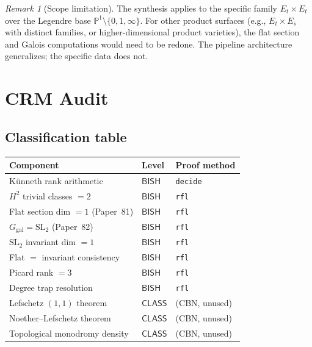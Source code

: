 \documentclass[11pt]{article}
\theoremstyle{plain}
\theoremstyle{definition}
\theoremstyle{remark}
\newtheorem{remark}[theorem]{Remark}
\newcommand{\SL}{\mathrm{SL}}
\newcommand{\Ggal}{G_{\mathrm{gal}}}
\newcommand{\BISH}{\mathsf{BISH}}
\newcommand{\CLASS}{\mathsf{CLASS}}
\begin{document}
\begin{remark}[Scope limitation]
The synthesis applies to the specific family $E_t \times E_t$ over the Legendre base $\mathbb{P}^1 \setminus \{0,1,\infty\}$.
For other product surfaces (e.g., $E_t \times E_s$ with distinct families, or higher-dimensional product varieties), the flat section and Galois computations would need to be redone.
The pipeline architecture generalizes; the specific data does not.
\end{remark}

\section{CRM Audit}
\label{sec:audit}

\subsection{Classification table}

\begin{center}
\renewcommand{\arraystretch}{1.1}
\begin{tabular}{@{}lll@{}}
\toprule
Component & Level & Proof method \\
\midrule
K\"unneth rank arithmetic & $\BISH$ & \texttt{decide} \\
$H^2$ trivial classes $= 2$ & $\BISH$ & \texttt{rfl} \\
Flat section dim $= 1$ (Paper~81) & $\BISH$ & \texttt{rfl} \\
$\Ggal = \SL_2$ (Paper~82) & $\BISH$ & \texttt{rfl} \\
$\SL_2$ invariant dim $= 1$ & $\BISH$ & \texttt{rfl} \\
Flat $=$ invariant consistency & $\BISH$ & \texttt{rfl} \\
Picard rank $= 3$ & $\BISH$ & \texttt{rfl} \\
Degree trap resolution & $\BISH$ & \texttt{rfl} \\
\midrule
Lefschetz $(1,1)$ theorem & $\CLASS$ & (CBN, unused) \\
Noether--Lefschetz theorem & $\CLASS$ & (CBN, unused) \\
Topological monodromy density & $\CLASS$ & (CBN, unused) \\
\bottomrule
\end{tabular}
\end{center}
\end{document}
